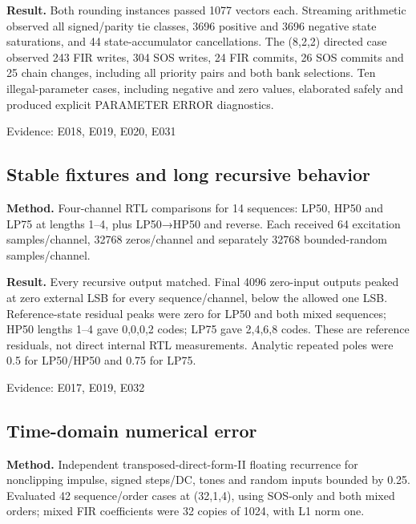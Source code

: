 \documentclass[11pt,a4paper]{article}
\begin{document}
\textbf{Result.} Both rounding instances passed 1077 vectors each. Streaming arithmetic observed all signed/\allowbreak{}parity tie classes,\allowbreak{} 3696 positive and 3696 negative state saturations,\allowbreak{} and 44 state-accumulator cancellations. The (\allowbreak{}8,\allowbreak{}2,\allowbreak{}2)\allowbreak{} directed case observed 243 FIR writes,\allowbreak{} 304 SOS writes,\allowbreak{} 24 FIR commits,\allowbreak{} 26 SOS commits and 25 chain changes,\allowbreak{} including all priority pairs and both bank selections. Ten illegal-parameter cases,\allowbreak{} including negative and zero values,\allowbreak{} elaborated safely and produced explicit PARAMETER ERROR diagnostics.

{\small Evidence: E018,\allowbreak{} E019,\allowbreak{} E020,\allowbreak{} E031}

\subsection{Stable fixtures and long recursive behavior}

\textbf{Method.} Four-channel RTL comparisons for 14 sequences: LP50,\allowbreak{} HP50 and LP75 at lengths 1–4,\allowbreak{} plus LP50{\vulcanmathsymbols →}HP50 and reverse. Each received 64 excitation samples/\allowbreak{}channel,\allowbreak{} 32768 zeros/\allowbreak{}channel and separately 32768 bounded-random samples/\allowbreak{}channel.

\textbf{Result.} Every recursive output matched. Final 4096 zero-input outputs peaked at zero external LSB for every sequence/\allowbreak{}channel,\allowbreak{} below the allowed one LSB. Reference-state residual peaks were zero for LP50 and both mixed sequences; HP50 lengths 1–4 gave 0,\allowbreak{}0,\allowbreak{}0,\allowbreak{}2 codes; LP75 gave 2,\allowbreak{}4,\allowbreak{}6,\allowbreak{}8 codes. These are reference residuals,\allowbreak{} not direct internal RTL measurements. Analytic repeated poles were 0.5 for LP50/\allowbreak{}HP50 and 0.75 for LP75.

{\small Evidence: E017,\allowbreak{} E019,\allowbreak{} E032}

\subsection{Time-domain numerical error}

\textbf{Method.} Independent transposed-direct-form-II floating recurrence for nonclipping impulse,\allowbreak{} signed steps/\allowbreak{}DC,\allowbreak{} tones and random inputs bounded by 0.25. Evaluated 42 sequence/\allowbreak{}order cases at (\allowbreak{}32,\allowbreak{}1,\allowbreak{}4)\allowbreak{},\allowbreak{} using SOS-only and both mixed orders; mixed FIR coefficients were 32 copies of 1024,\allowbreak{} with L1 norm one.
\end{document}

